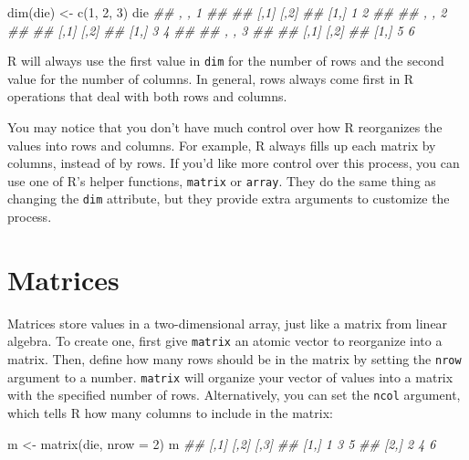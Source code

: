 \documentclass[
  letterpaper,
  DIV=11,
  numbers=noendperiod]{scrbook}
\newenvironment{Shaded}{\begin{snugshade}}{\end{snugshade}}
\newcommand{\AttributeTok}[1]{\textcolor[rgb]{0.40,0.45,0.13}{#1}}
\newcommand{\DecValTok}[1]{\textcolor[rgb]{0.68,0.00,0.00}{#1}}
\newcommand{\DocumentationTok}[1]{\textcolor[rgb]{0.37,0.37,0.37}{\textit{#1}}}
\newcommand{\FunctionTok}[1]{\textcolor[rgb]{0.28,0.35,0.67}{#1}}
\newcommand{\NormalTok}[1]{\textcolor[rgb]{0.00,0.23,0.31}{#1}}
\newcommand{\OtherTok}[1]{\textcolor[rgb]{0.00,0.23,0.31}{#1}}
\begin{document}
\begin{Shaded}
\begin{Highlighting}[]
\FunctionTok{dim}\NormalTok{(die) }\OtherTok{\textless{}{-}} \FunctionTok{c}\NormalTok{(}\DecValTok{1}\NormalTok{, }\DecValTok{2}\NormalTok{, }\DecValTok{3}\NormalTok{)}
\NormalTok{die}
\DocumentationTok{\#\# , , 1}
\DocumentationTok{\#\# }
\DocumentationTok{\#\#      [,1] [,2]}
\DocumentationTok{\#\# [1,]    1    2}
\DocumentationTok{\#\# }
\DocumentationTok{\#\# , , 2}
\DocumentationTok{\#\# }
\DocumentationTok{\#\#      [,1] [,2]}
\DocumentationTok{\#\# [1,]    3    4}
\DocumentationTok{\#\# }
\DocumentationTok{\#\# , , 3}
\DocumentationTok{\#\# }
\DocumentationTok{\#\#      [,1] [,2]}
\DocumentationTok{\#\# [1,]    5    6}
\end{Highlighting}
\end{Shaded}

R will always use the first value in \texttt{dim} for the number of rows
and the second value for the number of columns. In general, rows always
come first in R operations that deal with both rows and columns.

You may notice that you don't have much control over how R reorganizes
the values into rows and columns. For example, R always fills up each
matrix by columns, instead of by rows. If you'd like more control over
this process, you can use one of R's helper functions, \texttt{matrix}
or \texttt{array}. They do the same thing as changing the \texttt{dim}
attribute, but they provide extra arguments to customize the process.

\section{Matrices}\label{matrices}

Matrices store values in a two-dimensional array, just like a matrix
from linear algebra. To create one, first give \texttt{matrix} an atomic
vector to reorganize into a matrix. Then, define how many rows should be
in the matrix by setting the \texttt{nrow} argument to a number.
\texttt{matrix} will organize your vector of values into a matrix with
the specified number of rows. Alternatively, you can set the
\texttt{ncol} argument, which tells R how many columns to include in the
matrix:

\begin{Shaded}
\begin{Highlighting}[]
\NormalTok{m }\OtherTok{\textless{}{-}} \FunctionTok{matrix}\NormalTok{(die, }\AttributeTok{nrow =} \DecValTok{2}\NormalTok{)}
\NormalTok{m}
\DocumentationTok{\#\#      [,1] [,2] [,3]}
\DocumentationTok{\#\# [1,]    1    3    5}
\DocumentationTok{\#\# [2,]    2    4    6}
\end{Highlighting}
\end{Shaded}
\end{document}
